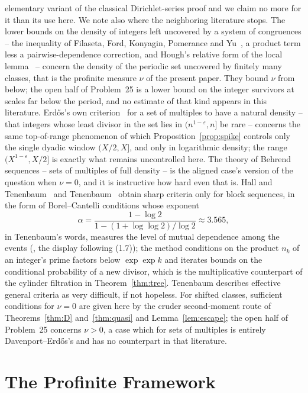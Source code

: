 \documentclass[11pt]{article}
\theoremstyle{plain}
\theoremstyle{definition}
\begin{document}
elementary variant of the classical Dirichlet-series proof and
we claim no more for it than its use here.  We note also
where the neighboring literature stops.  The lower bounds on
the density of integers left uncovered by a system of congruences
-- the inequality of Filaseta, Ford, Konyagin, Pomerance and
Yu~\cite{FFKPY}, a product term less a pairwise-dependence
correction, and Hough's relative form of the local
lemma~\cite{Hough} -- concern the density of the periodic set
uncovered by finitely many classes, that is the profinite
measure $\nu$ of the present paper.  They bound $\nu$ from
below; the open half of Problem~25 is a lower bound on the
integer survivors at scales far below the period, and no
estimate of that kind appears in this literature.  Erd\H{o}s's
own criterion~\cite{Er48} for a set of multiples to have a
natural density -- that integers whose least divisor in the set
lies in $(n^{1-\varepsilon},n]$ be rare -- concerns the same
top-of-range phenomenon of which Proposition~\ref{prop:spike}
controls only the single dyadic window $(X/2,X]$, and only in
logarithmic density; the range $(X^{1-\varepsilon},X/2]$ is
exactly what remains uncontrolled here.  The theory of Behrend sequences -- sets of
multiples of full density -- is the aligned case's version of
the question when $\nu=0$, and it is instructive how hard even
that is.  Hall and Tenenbaum~\cite{HT92} and
Tenenbaum~\cite{Ten96} obtain sharp criteria only for block
sequences, in the form of Borel--Cantelli conditions whose exponent
\[
  \alpha=\frac{1-\log2}{1-(1+\log\log2)/\log2}\approx3.565,
\]
in Tenenbaum's words, measures the level of mutual dependence
among the events (\cite{Ten96}, the display following (1.7)); the method conditions on the product $n_k$ of an
integer's prime factors below $\exp\exp k$ and iterates bounds
on the conditional probability of a new divisor, which is the
multiplicative counterpart of the cylinder filtration in
Theorem~\ref{thm:tree}.  Tenenbaum describes effective general
criteria as very difficult, if not hopeless.  For shifted
classes, sufficient conditions for $\nu=0$ are given here by
the cruder second-moment route of Theorems~\ref{thm:D}
and~\ref{thm:quasi} and Lemma~\ref{lem:escape}; the open half of
Problem~25 concerns $\nu>0$, a case which for sets of multiples
is entirely Davenport--Erd\H{o}s's and has no counterpart in
that literature.

\section{The Profinite Framework}\label{sec:profinite}
\end{document}
